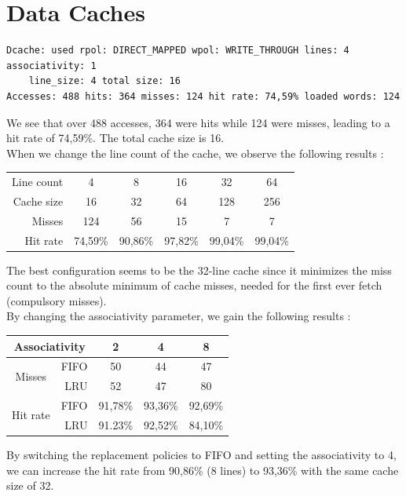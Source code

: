 \documentclass[a4paper]{report}
\begin{document}

\section{Data Caches}

\begin{verbatim}
Dcache: used rpol: DIRECT_MAPPED wpol: WRITE_THROUGH lines: 4 associativity: 1
    line_size: 4 total size: 16
Accesses: 488 hits: 364 misses: 124 hit rate: 74,59% loaded words: 124
\end{verbatim}

We see that over 488 accesses, 364 were hits while 124 were misses, leading to a hit rate of 74,59\%. The
total cache size is 16.
\mbox{}\\

When we change the line count of the cache, we observe the following results :

\begin{center}
	\begin{tabular}{|r||c|c|c|c|c|}
		\hline
		Line count & 4 & 8 & 16 & 32 & 64 \\
		Cache size & 16 & 32 & 64 & 128 & 256 \\
		Misses     & 124 & 56 & 15 & 7 & 7 \\
		Hit rate   & 74,59\% & 90,86\% & 97,82\% & 99,04\% & 99,04\% \\
		\hline
	\end{tabular}
\end{center}

The best configuration seems to be the 32-line cache since it minimizes the miss count to the absolute minimum
of cache misses, needed for the first ever fetch (compulsory misses).
\mbox{}\\

By changing the associativity parameter, we gain the following results :

\begin{center}
	\begin{tabular}{|c|r||c|c|c|}
		\hline
		\multicolumn{2}{|c||}{Associativity} & 2 & 4 & 8 \\
		\hline
		\multirow{2}{*}{Misses}   & FIFO  & 50 & 44 & 47 \\
		                          & LRU   & 52 & 47 & 80 \\
		\multirow{2}{*}{Hit rate} & FIFO  & 91,78\% & 93,36\% & 92,69\% \\
		                          & LRU   & 91.23\% & 92,52\% & 84,10\% \\
		\hline
	\end{tabular}
\end{center}

By switching the replacement policies to FIFO and setting the associativity to 4, we can increase the hit
rate from 90,86\% (8 lines) to 93,36\% with the same cache size of 32.
\end{document}
